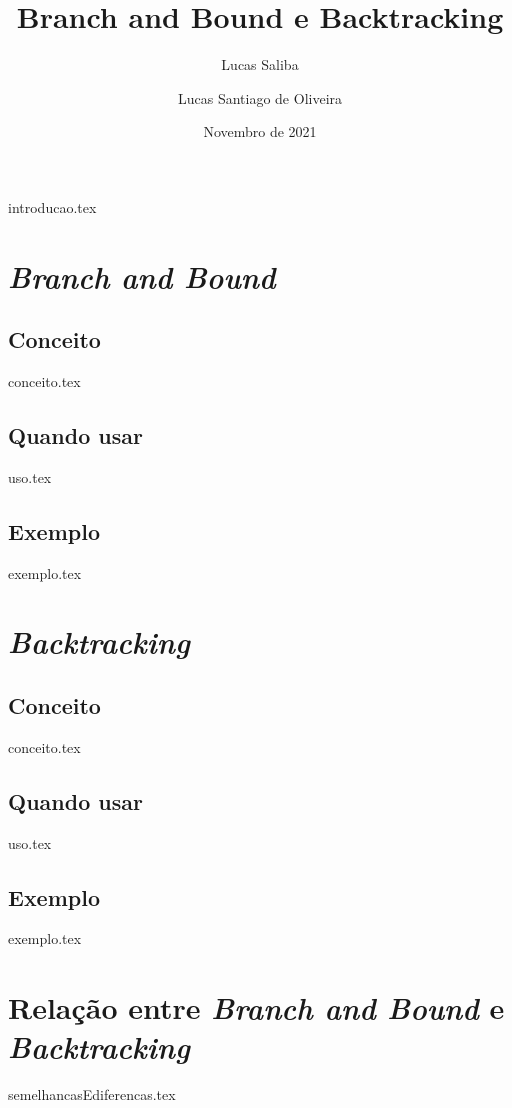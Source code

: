 \documentclass{article}
\title{Branch and Bound e Backtracking}
\author{Lucas Saliba \and Lucas Santiago de Oliveira}
\date{Novembro de 2021}
\begin{document}
\maketitle
\vspace{1cm}
\tableofcontents
\newpage

{introducao.tex}

\section{\emph{Branch and Bound}}
\subsection{Conceito}
{conceito.tex}

\subsection{Quando usar}
{uso.tex}

\subsection{Exemplo}
{exemplo.tex}

\section{\emph{Backtracking}}
\subsection{Conceito}
{conceito.tex}

\subsection{Quando usar}
{uso.tex}

\subsection{Exemplo}
{exemplo.tex}

\section{Relação entre \emph{Branch and Bound} e \emph{Backtracking}}
{semelhancasEdiferencas.tex}
\end{document}
